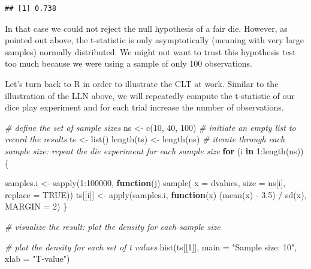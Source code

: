 \documentclass[
  12pt,
]{style/krantz}
\newenvironment{Shaded}{\begin{snugshade}}{\end{snugshade}}
\newcommand{\AttributeTok}[1]{\textcolor[rgb]{0.77,0.63,0.00}{#1}}
\newcommand{\CommentTok}[1]{\textcolor[rgb]{0.56,0.35,0.01}{\textit{#1}}}
\newcommand{\ConstantTok}[1]{\textcolor[rgb]{0.00,0.00,0.00}{#1}}
\newcommand{\ControlFlowTok}[1]{\textcolor[rgb]{0.13,0.29,0.53}{\textbf{#1}}}
\newcommand{\DecValTok}[1]{\textcolor[rgb]{0.00,0.00,0.81}{#1}}
\newcommand{\FloatTok}[1]{\textcolor[rgb]{0.00,0.00,0.81}{#1}}
\newcommand{\FunctionTok}[1]{\textcolor[rgb]{0.00,0.00,0.00}{#1}}
\newcommand{\NormalTok}[1]{#1}
\newcommand{\OtherTok}[1]{\textcolor[rgb]{0.56,0.35,0.01}{#1}}
\newcommand{\SpecialCharTok}[1]{\textcolor[rgb]{0.00,0.00,0.00}{#1}}
\newcommand{\StringTok}[1]{\textcolor[rgb]{0.31,0.60,0.02}{#1}}
\begin{document}
\begin{verbatim}
## [1] 0.738
\end{verbatim}

In that case we could not reject the null hypothesis of a fair die. However, as pointed out above, the t-statistic is only asymptotically (meaning with very large samples) normally distributed. We might not want to trust this hypothesis test too much because we were using a sample of only 100 observations.

Let's turn back to R in order to illustrate the CLT at work. Similar to the illustration of the LLN above, we will repeatedly compute the t-statistic of our dice play experiment and for each trial increase the number of observations.

\begin{Shaded}
\begin{Highlighting}[]
\CommentTok{\# define the set of sample sizes}
\NormalTok{ns }\OtherTok{\textless{}{-}} \FunctionTok{c}\NormalTok{(}\DecValTok{10}\NormalTok{, }\DecValTok{40}\NormalTok{, }\DecValTok{100}\NormalTok{)}
\CommentTok{\# initiate an empty list to record the results}
\NormalTok{ts }\OtherTok{\textless{}{-}} \FunctionTok{list}\NormalTok{()}
\FunctionTok{length}\NormalTok{(ts) }\OtherTok{\textless{}{-}} \FunctionTok{length}\NormalTok{(ns)}
\CommentTok{\# iterate through each sample size: \textquotesingle{}repeat the die experiment for each sample size\textquotesingle{}}
\ControlFlowTok{for}\NormalTok{ (i }\ControlFlowTok{in} \DecValTok{1}\SpecialCharTok{:}\FunctionTok{length}\NormalTok{(ns)) \{}
     
\NormalTok{     samples.i }\OtherTok{\textless{}{-}} \FunctionTok{sapply}\NormalTok{(}\DecValTok{1}\SpecialCharTok{:}\DecValTok{100000}\NormalTok{, }\ControlFlowTok{function}\NormalTok{(j) }\FunctionTok{sample}\NormalTok{( }\AttributeTok{x =}\NormalTok{ dvalues,}
                                                       \AttributeTok{size =}\NormalTok{ ns[i],}
                                                       \AttributeTok{replace =} \ConstantTok{TRUE}\NormalTok{))}
\NormalTok{     ts[[i]] }\OtherTok{\textless{}{-}} \FunctionTok{apply}\NormalTok{(samples.i, }\ControlFlowTok{function}\NormalTok{(x) (}\FunctionTok{mean}\NormalTok{(x) }\SpecialCharTok{{-}} \FloatTok{3.5}\NormalTok{) }\SpecialCharTok{/} \FunctionTok{sd}\NormalTok{(x), }\AttributeTok{MARGIN =} \DecValTok{2}\NormalTok{)}
\NormalTok{\}}

\CommentTok{\# visualize the result: plot the density for each sample size}

\CommentTok{\# plot the density for each set of t values}
\FunctionTok{hist}\NormalTok{(ts[[}\DecValTok{1}\NormalTok{]], }\AttributeTok{main =} \StringTok{"Sample size: 10"}\NormalTok{, }\AttributeTok{xlab =} \StringTok{"T{-}value"}\NormalTok{)}
\end{Highlighting}
\end{Shaded}
\end{document}
